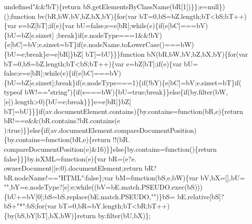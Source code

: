 \begin{DoxyCode}
{{      undefined"}&&!bT)\{\textcolor{keywordflow}{return} bS.getElementsByClassName(bR[1])\}\};e=null\})();\textcolor{keyword}{function} bv(bR,bW,bV,bZ,bX,bY)\{\textcolor{keywordflow}{for}(var 
      bT=0,bS=bZ.length;bT<bS;bT++)\{var e=bZ[bT];\textcolor{keywordflow}{if}(e)\{var bU=\textcolor{keyword}{false};e=e[bR];\textcolor{keywordflow}{while}(e)\{\textcolor{keywordflow}{if}(e[bC]===bV)\{bU=bZ[e.sizset]
      ;\textcolor{keywordflow}{break}\}\textcolor{keywordflow}{if}(e.nodeType===1&&!bY)\{e[bC]=bV;e.sizset=bT\}\textcolor{keywordflow}{if}(e.nodeName.toLowerCase()===bW)\{bU=e;\textcolor{keywordflow}{break}\}e=e[bR]\}bZ[
      bT]=bU\}\}\}\textcolor{keyword}{function} bN(bR,bW,bV,bZ,bX,bY)\{\textcolor{keywordflow}{for}(var bT=0,bS=bZ.length;bT<bS;bT++)\{var e=bZ[bT];\textcolor{keywordflow}{if}(e)\{var bU=\textcolor{keyword}{
      false};e=e[bR];\textcolor{keywordflow}{while}(e)\{\textcolor{keywordflow}{if}(e[bC]===bV)\{bU=bZ[e.sizset];\textcolor{keywordflow}{break}\}\textcolor{keywordflow}{if}(e.nodeType===1)\{\textcolor{keywordflow}{if}(!bY)\{e[bC]=bV;e.sizset=bT\}\textcolor{keywordflow}{if}(
      typeof bW!==\textcolor{stringliteral}{"string"})\{\textcolor{keywordflow}{if}(e===bW)\{bU=\textcolor{keyword}{true};\textcolor{keywordflow}{break}\}\}\textcolor{keywordflow}{else}\{\textcolor{keywordflow}{if}(by.filter(bW,[e]).length>0)\{bU=e;\textcolor{keywordflow}{break}\}\}\}e=e[bR]\}bZ[
      bT]=bU\}\}\}\textcolor{keywordflow}{if}(av.documentElement.contains)\{by.contains=\textcolor{keyword}{function}(bR,e)\{\textcolor{keywordflow}{return} bR!==e&&(bR.contains?bR.contains(e
      ):\textcolor{keyword}{true})\}\}\textcolor{keywordflow}{else}\{\textcolor{keywordflow}{if}(av.documentElement.compareDocumentPosition)\{by.contains=\textcolor{keyword}{function}(bR,e)\{\textcolor{keywordflow}{return} !!(bR.
      compareDocumentPosition(e)&16)\}\}\textcolor{keywordflow}{else}\{by.contains=\textcolor{keyword}{function}()\{\textcolor{keywordflow}{return} \textcolor{keyword}{false}\}\}\}by.isXML=\textcolor{keyword}{function}(e)\{var bR=(e?e.
      ownerDocument||e:0).documentElement;\textcolor{keywordflow}{return} bR?bR.nodeName!==\textcolor{stringliteral}{"HTML"}:\textcolor{keyword}{false}\};var bM=\textcolor{keyword}{function}(bS,e,bW)\{var bV,bX=[],bU=\textcolor{stringliteral}{
      ""},bY=e.nodeType?[e]:e;\textcolor{keywordflow}{while}((bV=bE.match.PSEUDO.exec(bS)))\{bU+=bV[0];bS=bS.replace(bE.match.PSEUDO,\textcolor{stringliteral}{""})\}bS=
      bE.relative[bS]?bS+\textcolor{stringliteral}{"*"}:bS;\textcolor{keywordflow}{for}(var bT=0,bR=bY.length;bT<bR;bT++)\{by(bS,bY[bT],bX,bW)\}\textcolor{keywordflow}{return} by.filter(bU,bX)\};
}
\end{DoxyCode}
